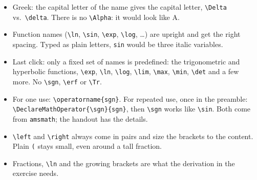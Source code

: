 \begin{frame}[fragile]
{\begin{itemize}
            \item Greek: the capital letter of the name gives the capital letter, \texttt{\textbackslash Delta} vs.\ \texttt{\textbackslash delta}.
                There is no \texttt{\textbackslash Alpha}: it would look like A.
            \item Function names (\texttt{\textbackslash ln}, \texttt{\textbackslash sin}, \texttt{\textbackslash exp}, \texttt{\textbackslash log}, \ldots)
                are upright and get the right spacing.
                Typed as plain letters, \texttt{sin} would be three italic variables.
            \item Last click: only a fixed set of names is predefined:
                the trigonometric and hyperbolic functions, \texttt{\textbackslash exp}, \texttt{\textbackslash ln}, \texttt{\textbackslash log},
                \texttt{\textbackslash lim}, \texttt{\textbackslash max}, \texttt{\textbackslash min}, \texttt{\textbackslash det} and a few more.
                No \texttt{\textbackslash sgn}, \texttt{\textbackslash erf} or \texttt{\textbackslash Tr}.
            \item For one use: \texttt{\textbackslash operatorname\{sgn\}}.
                For repeated use, once in the preamble: \texttt{\textbackslash DeclareMathOperator\{\textbackslash sgn\}\{sgn\}}, then \texttt{\textbackslash sgn} works like \texttt{\textbackslash sin}.
                Both come from \texttt{amsmath}; the handout has the details.
            \item \texttt{\textbackslash left} and \texttt{\textbackslash right} always come in pairs and size the brackets to the content.
                Plain \texttt{(} stays small, even around a tall fraction.
            \item Fractions, \texttt{\textbackslash ln} and the growing brackets are what the derivation in the exercise needs.
        \end{itemize}
    }
\end{frame}

